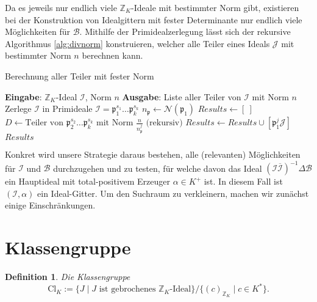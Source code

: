 \documentclass[12pt,a4paper,halfparskip,headsepline,bibtotocnumbered]{scrreprt}
\theoremstyle{nummermitklammern}
\newtheorem{definition}[defsatzusw]{Definition}
\theoremstyle{nonumberbreak}
\newcommand{\Z}{\mathbb{Z}}
\newcommand{\B}{\mathcal{B}}
\newcommand{\No}{\mathcal{N}}
\newcommand{\I}{\mathcal{I}}
\newcommand{\J}{\mathcal{J}}
\newcommand{\p}{\mathfrak{p}}
\begin{document}
Da es jeweils nur endlich viele $\Z_K$-Ideale mit bestimmter Norm gibt, existieren bei der Konstruktion von Idealgittern mit fester Determinante nur endlich viele Möglichkeiten für $\B$. Mithilfe der Primidealzerlegung lässt sich der rekursive Algorithmus \eqref{alg:divnorm} konstruieren, welcher alle Teiler eines Ideals $\J$ mit bestimmter Norm $n$ berechnen kann.

\begin{algorithm}
	\caption{Berechnung aller Teiler mit fester Norm}\label{alg:divnorm}
	\begin{algorithmic}[1]
		\State \textbf{Eingabe}: $\Z_K$-Ideal $\I$, Norm $n$
		\State \textbf{Ausgabe}: Liste aller Teiler von $\I$ mit Norm $n$
		\\
		 \Return {$\left[ \Z_K \right]$} \EndIf
		\If {$n \nmid \No(\I))$} \Return {$\left[ \ \right]$} \EndIf
		\If {$\No(\I) = n$} \Return {$\left[ \I \right]$} \EndIf
		\State Zerlege $\I$ in Primideale $\I = \p_1^{s_1} \dots \p_k^{s_k}$
		\State $n_\p \gets \No(\p_1)$
		\State $Results \gets \left[ \ \right]$
			\If {$n_\p^j \mid n$}
				\State $D \gets \text{Teiler von } \p_2^{s_2} \dots \p_k^{s_k} \text{ mit Norm } \frac{n}{n_\p^j} \text{ (rekursiv)}$
				\For {$\J \in D$}
					\State $Results \gets Results \cup \left[\p_1^j \J \right]$
				\EndFor
			\EndIf
		\EndFor
		\State \Return $Results$
	\end{algorithmic}
\end{algorithm}

Konkret wird unsere Strategie daraus bestehen, alle (relevanten) Möglichkeiten für $\I$ und $\B$ durchzugehen und zu testen, für welche davon das Ideal $\left( \I \overline{\I} \right)^{-1} \Delta \B$ ein Hauptideal mit total-positivem Erzeuger $\alpha \in K^+$ ist. In diesem Fall ist $(\I, \alpha)$ ein Ideal-Gitter. Um den Suchraum zu verkleinern, machen wir zunächst einige Einschränkungen.

\section{Klassengruppe}

\begin{framed}
	\begin{definition}
		Die \textit{Klassengruppe} 
		\begin{equation*}
			\text{Cl}_K := \lbrace J \mid J \text{ ist gebrochenes } \Z_K \text{-Ideal} \rbrace / \lbrace (c)_{\Z_K} \mid c \in K^\ast \rbrace.
		\end{equation*}
	\end{definition}
\end{framed}
\end{document}

